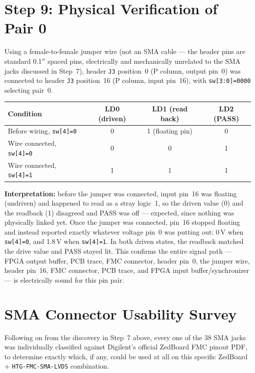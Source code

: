 \documentclass[11pt]{article}
\begin{document}
\section{Step 9: Physical Verification of Pair 0}

Using a female-to-female jumper wire (not an SMA cable --- the header pins are standard
0.1$''$ spaced pins, electrically and mechanically unrelated to the SMA jacks discussed
in Step~7), header \texttt{J3} position~0 (P column, output pin~0) was connected to
header \texttt{J3} position~16 (P column, input pin~16), with \texttt{sw[3:0]=0000}
selecting pair~0.

\begin{center}
\begin{tabular}{@{}lccc@{}}
\toprule
\textbf{Condition} & \textbf{LD0 (driven)} & \textbf{LD1 (read back)} & \textbf{LD2 (PASS)} \\
\midrule
Before wiring, \texttt{sw[4]=0} & 0 & 1 (floating pin) & 0 \\
Wire connected, \texttt{sw[4]=0} & 0 & 0 & 1 \\
Wire connected, \texttt{sw[4]=1} & 1 & 1 & 1 \\
\bottomrule
\end{tabular}
\end{center}

\textbf{Interpretation:} before the jumper was connected, input pin~16 was floating
(undriven) and happened to read as a stray logic~1, so the driven value (0) and the
readback (1) disagreed and PASS was off --- expected, since nothing was physically
linked yet. Once the jumper was connected, pin~16 stopped floating and instead reported
exactly whatever voltage pin~0 was putting out: 0\,V when \texttt{sw[4]=0}, and 1.8\,V
when \texttt{sw[4]=1}. In both driven states, the readback matched the drive value and
PASS stayed lit. This confirms the entire signal path --- FPGA output buffer, PCB trace,
FMC connector, header pin~0, the jumper wire, header pin~16, FMC connector, PCB trace,
and FPGA input buffer/synchronizer --- is electrically sound for this pin pair.

\section{SMA Connector Usability Survey}
\label{sec:sma}

Following on from the discovery in Step~7 above, every one of the 38 SMA jacks was individually classified
against Digilent's official ZedBoard FMC pinout PDF, to determine exactly which, if any,
could be used at all on this specific ZedBoard + \texttt{HTG-FMC-SMA-LVDS} combination.
\end{document}
